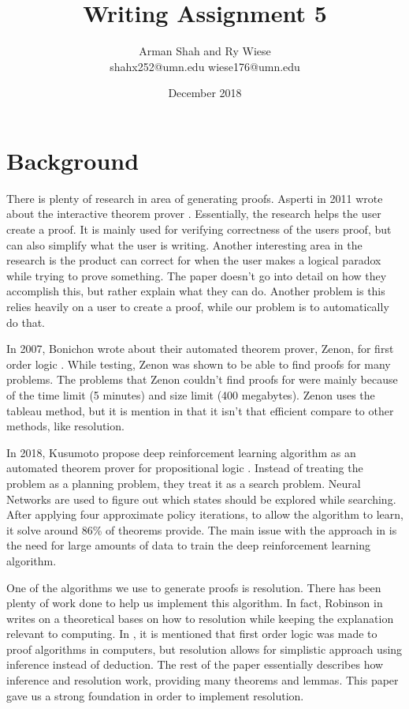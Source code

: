 \documentclass{article}
\title{Writing Assignment 5}
\author{Arman Shah and Ry Wiese\\ shahx252@umn.edu  wiese176@umn.edu }
\date{December 2018}
\begin{document}
\maketitle

\section{Background}

There is plenty of research in area of generating proofs. Asperti in 2011 wrote about the interactive theorem prover \cite{asperti2011matita}. Essentially, the research helps the user create a proof. It is mainly used for verifying correctness of the users proof, but can also simplify what the user is writing. Another interesting area in the research is the product can correct for when the user makes a logical paradox while trying to prove something. The paper doesn't go into detail on how they accomplish this, but rather explain what they can do. Another problem is this relies heavily on a user to create a proof, while our problem is to automatically do that.

In 2007, Bonichon wrote about their automated theorem prover, Zenon, for first order logic \cite{bonichon2007zenon}. While testing, Zenon was shown to be able to find proofs for many problems. The problems that Zenon couldn't find proofs for were mainly because of the time limit (5 minutes) and size limit (400 megabytes). Zenon uses the tableau method, but it is mention in \cite{bonichon2007zenon} that it isn't that efficient compare to other methods, like resolution.

In 2018, Kusumoto propose deep reinforcement learning algorithm as an automated theorem prover for propositional logic \cite{kusumoto2018automated}. Instead of treating the problem as a planning problem, they treat it as a search problem. Neural Networks are used to figure out which states should be explored while searching. After applying four approximate policy iterations, to allow the algorithm to learn, it solve around 86\% of theorems provide. The main issue with the approach in \cite{kusumoto2018automated} is the need for large amounts of data to train the deep reinforcement learning algorithm.

One of the algorithms we use to generate proofs is resolution. 
There has been plenty of work done to help us implement this algorithm. In fact, Robinson in \cite{robinson1965machine} writes on a theoretical bases on how to resolution while keeping the explanation relevant to computing. In \cite{robinson1965machine}, it is mentioned that first order logic was made to proof algorithms in computers, but resolution allows for simplistic approach using inference instead of deduction. The rest of the paper essentially describes how inference and resolution work, providing many theorems and lemmas. This paper gave us a strong foundation in order to implement resolution.
\end{document}
